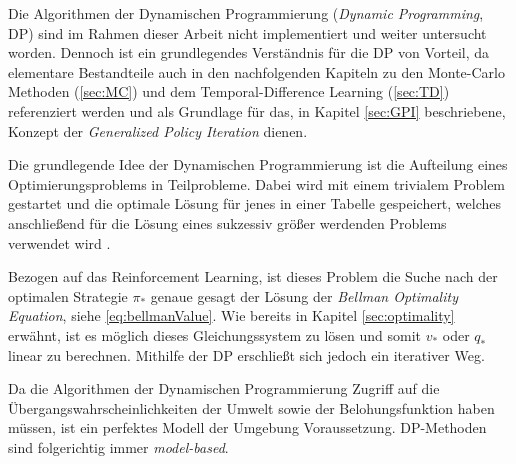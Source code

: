 Die Algorithmen der Dynamischen Programmierung (\textit{Dynamic Programming}, DP) sind im Rahmen dieser Arbeit nicht implementiert und weiter untersucht worden. Dennoch ist ein grundlegendes Verständnis für die DP von Vorteil, da elementare Bestandteile auch in den nachfolgenden Kapiteln zu den Monte-Carlo Methoden (\ref{sec:MC}) und dem Temporal-Difference Learning (\ref{sec:TD}) referenziert werden und als Grundlage für das, in Kapitel \ref{sec:GPI} beschriebene, Konzept der \textit{Generalized Policy Iteration} dienen.
\par 
Die grundlegende Idee der Dynamischen Programmierung ist die Aufteilung eines Optimierungsproblems in Teilprobleme. Dabei wird mit einem trivialem Problem gestartet und die optimale Lösung für jenes in einer Tabelle gespeichert, welches anschließend für die Lösung eines sukzessiv größer werdenden Problems verwendet wird \cite[S.~243]{mehlhorn}.
\par 
Bezogen auf das Reinforcement Learning, ist dieses Problem die Suche nach der optimalen Strategie $\pi_*$ genaue gesagt der Lösung der \textit{Bellman Optimality Equation}, siehe \ref{eq:bellmanValue}. Wie bereits in Kapitel \ref{sec:optimality} erwähnt, ist es möglich dieses Gleichungssystem zu lösen und somit $v_*$ oder $q_*$ linear zu berechnen. Mithilfe der DP erschließt sich jedoch ein iterativer Weg.
\par 
Da die Algorithmen der Dynamischen Programmierung Zugriff auf die Übergangswahrscheinlichkeiten der Umwelt sowie der Belohungsfunktion haben müssen, ist ein perfektes Modell der Umgebung Voraussetzung. DP-Methoden sind folgerichtig immer \textit{model-based}.
\par

